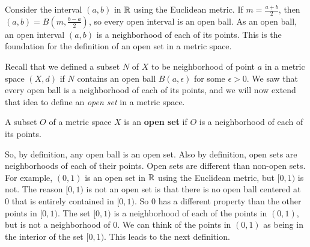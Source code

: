 \label{chap:open_sets}


\vspace*{-17 pt}

\vspace*{13 pt}

\label{sec_open_sets_intro}

Consider the interval $(a,b)$ in $\mathbb{R}$ using the Euclidean metric. If $m = \frac{a+b}{2}$, then $(a,b) = B\left(m,\frac{b-a}{2}\right)$, so every open interval is an open ball. As an open ball, an open interval $(a,b)$ is a neighborhood of each of its points. This is the foundation for the definition of an open set in a metric space. 

Recall that we defined a subset $N$ of $X$ to be neighborhood of point $a$ in a metric space $(X,d)$ if $N$ contains an open ball $B(a, \epsilon)$ for some $\epsilon > 0$. We saw that every open ball is a neighborhood of each of its points, and we will now extend that idea to define an \emph{open set} in a metric space.

\begin{definition} A subset $O$ of a metric space $X$ is an \textbf{open set} if $O$ is a neighborhood of each of its points.
\end{definition}

So, by definition, any open ball is an open set. Also by definition, open sets are neighborhoods of each of their points. Open sets are different than non-open sets. For example, $(0,1)$ is an open set in $\mathbb{R}$ using the Euclidean metric, but $[0,1)$ is not. The reason $[0,1)$ is not an open set is that there is no open ball centered at $0$ that is entirely contained in $[0,1)$. So $0$ has a different property than the other points in $[0,1)$. The set $[0,1)$ is a neighborhood of each of the points in $(0,1)$, but is not a neighborhood of $0$. We can think of the points in $(0,1)$ as being in the interior of the set $[0,1)$. This leads to the next definition. 

